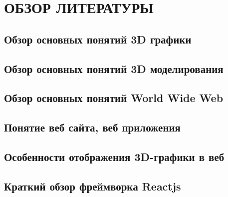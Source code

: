 \section{ОБЗОР ЛИТЕРАТУРЫ}
\label{sec:domain}

\subsection{Обзор основных понятий 3D графики}
\label{sub:domain:overview_3d}


\subsection{Обзор основных понятий 3D моделирования}
\label{sub:domain:overview_3d_modelling}


\subsection{Обзор основных понятий World Wide Web}
\label{sub:domain:overview_www}


\subsection{Понятие веб сайта, веб приложения}
\label{sub:domain:overview_website}


\subsection{Особенности отображения 3D-графики в веб}
\label{sub:domain:overview_3d_in_web}


\subsection{Краткий обзор фреймворка Reactjs}
\label{sub:domain:overview_spa_frameworks}

